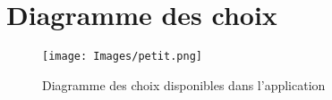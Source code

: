\documentclass[a4paper,12pt]{article} %
\begin{document}
    \section{\label{annexe6}Diagramme des choix}
    \begin{figure}[H]
        \centering
        \texttt{[image: Images/petit.png]}
        \caption{Diagramme des choix disponibles dans l'application}
        \label{fig:my_label}
    \end{figure}
    	
\begin{figure}
\begin{center}
\end{center}
\end{figure}
\end{document}
